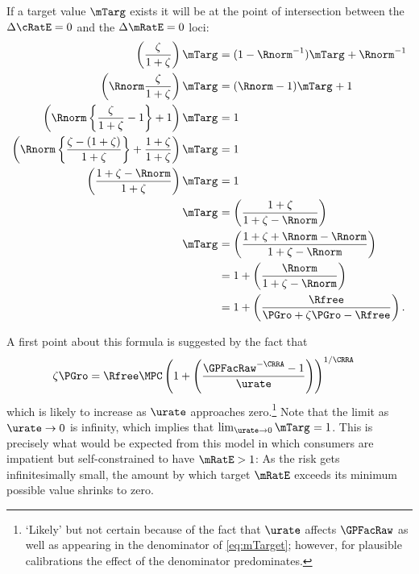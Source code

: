 \documentclass{handout}
\begin{document}
If a target value $\mTarg$ exists it will be at the point of intersection between the $\dcEqZero$ and the $\dmEqZero$ loci:
\begin{equation}\begin{gathered}\begin{aligned}
  \left(\frac{\zeta}{1+\zeta}\right)\mTarg^{\null} & =  (1-\Rnorm^{-1})\mTarg^{\null}+\Rnorm^{-1}
\\  \left(\Rnorm\frac{\zeta}{1+\zeta}\right)\mTarg^{\null} & =  (\Rnorm-1)\mTarg^{\null}+1
\\  \left(\Rnorm\left\{\frac{\zeta}{1+\zeta}-1\right\}+1\right)\mTarg^{\null} & =  1
\\  \left(\Rnorm\left\{\frac{\zeta-(1+\zeta)}{1+\zeta}\right\}+\frac{1+\zeta}{1+\zeta}\right)\mTarg^{\null} & =  1
\\  \left(\frac{1+\zeta-\Rnorm}{1+\zeta}\right)\mTarg^{\null} & =  1
\\  \mTarg^{\null} & =  \left(\frac{1+\zeta}{1+\zeta-\Rnorm}\right)
\\  \mTarg^{\null} & =  \left(\frac{1+\zeta+\Rnorm-\Rnorm}{1+\zeta-\Rnorm}\right)
\\ & =  1 + \left(\frac{\Rnorm}{1+\zeta-\Rnorm}\right)
\\ & =  1 + \left(\frac{\Rfree}{\PGro+\zeta\PGro-\Rfree}\right)  \label{eq:mTarget}
.
\end{aligned}\end{gathered}\end{equation}

A first point about this formula is suggested by the fact that
\begin{equation}\begin{gathered}\begin{aligned}
  \zeta\PGro & =  \Rfree \MPCU \left(1+\left(\frac{\GPFacRaw^{-\CRRA} - 1}{\urate}\right)\right)^{1/\CRRA}
\end{aligned}\end{gathered}\end{equation}
which is likely to increase as $\urate$ approaches zero.\footnote{`Likely' but not certain because of the fact that $\urate$ affects $\GPFacRaw$ as well as
  appearing in the denominator of \eqref{eq:mTarget}; however, for
  plausible calibrations the effect of the denominator predominates.}
Note that the limit as $\urate \rightarrow 0$ is infinity, which
implies that $\lim_{\urate \rightarrow
  0} \mTarg^{\null} = 1$.  This is precisely what would be expected from
this model in which consumers are impatient but self-constrained to
have $\mRatE > 1$:  As the risk gets infinitesimally small, the
amount by which target $\mRatE$ exceeds its minimum possible value shrinks to
zero.
\end{document}
